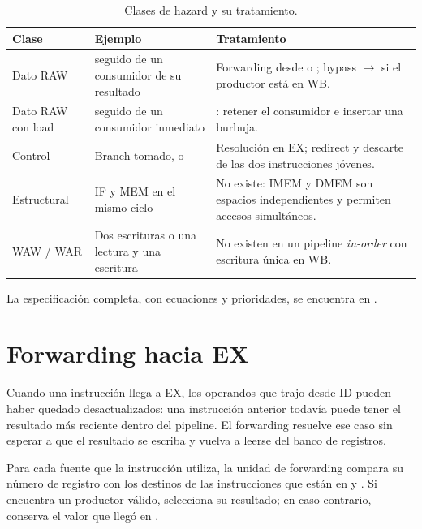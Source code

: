 \begin{table}[H]
  \centering
  \small
  \begin{tabularx}{\textwidth}{L{3.0cm}L{3.6cm}Y}
    \toprule
    \textbf{Clase} & \textbf{Ejemplo} & \textbf{Tratamiento} \\
    \midrule
    Dato RAW &  seguido de un consumidor de su resultado &
    Forwarding desde  o ; bypass
    $\rightarrow$ si el productor está en WB. \\
    \addlinespace
    Dato RAW con load &  seguido de un consumidor inmediato &
    : retener el consumidor e insertar una burbuja. \\
    \addlinespace
    Control & Branch tomado,  o  & Resolución en EX;
    redirect y descarte de las dos instrucciones jóvenes. \\
    \addlinespace
    Estructural & IF y MEM en el mismo ciclo & No existe: IMEM y DMEM son
    espacios independientes y permiten accesos simultáneos. \\
    \addlinespace
    WAW / WAR & Dos escrituras o una lectura y una escritura & No existen en un
    pipeline \emph{in-order} con escritura única en WB. \\
    \bottomrule
  \end{tabularx}
  \caption{Clases de hazard y su tratamiento.}
  \label{tab:tipos-hazard}
\end{table}

La especificación completa, con ecuaciones y prioridades, se encuentra en
.

\section{Forwarding hacia EX}

Cuando una instrucción llega a EX, los operandos que trajo desde ID pueden
haber quedado desactualizados: una instrucción anterior todavía puede tener el
resultado más reciente dentro del pipeline. El forwarding resuelve ese caso
sin esperar a que el resultado se escriba y vuelva a leerse del banco de
registros.

Para cada fuente que la instrucción utiliza, la unidad de forwarding compara
su número de registro con los destinos de las instrucciones que están en
 y . Si encuentra un productor válido, selecciona
su resultado; en caso contrario, conserva el valor que llegó en .

